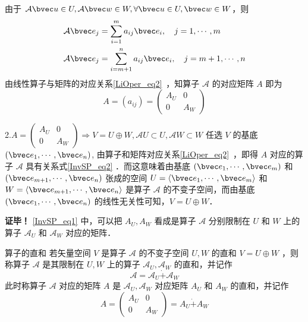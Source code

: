 由于 $\mathcal{A}\bvec u\in U, \mathcal{A}\bvec w\in W,\forall \bvec u\in U,\bvec w\in W$，则
\begin{equation}\label{InvSP_eq2}
\begin{aligned}
\mathcal{A}\bvec e_j&=\sum_{i=1}^m a_{ij}\bvec e_i,\quad j=1,\cdots ,m\\
\mathcal{A}\bvec e_j&=\sum_{i=m+1}^n a_{ij}\bvec e_i,\quad j=m+1,\cdots ,n
\end{aligned}
\end{equation}
由线性算子与矩阵的对应关系\autoref{LiOper_eq2}~，知算子 $\mathcal{A}$ 的对应矩阵 $A$ 即为 
\begin{equation}
A=(a_{ij})=\begin{pmatrix}
A_U&0\\
0&A_W
\end{pmatrix}
\end{equation}

2.$
A=\begin{pmatrix}
A_U&0\\
0&A_W
\end{pmatrix}\Rightarrow V=U\oplus W,\mathcal{A}U\subset U,\mathcal{A}W\subset W
$
任选 $V$ 的基底 $(\bvec e_1,\cdots,\bvec e_n)$, 由算子和矩阵对应关系\autoref{LiOper_eq2}~，即得 $A$ 对应的算子 $\mathcal{A}$ 具有关系式\autoref{InvSP_eq2} ．而这意味着由基底 $(\bvec e_1,\cdots,\bvec e_m)$ 和 $(\bvec e_{m+1},\cdots,\bvec e_n)$ 张成的空间 $U=\langle\bvec e_1,\cdots,\bvec e_m\rangle$ 和 $W=\langle\bvec e_{m+1},\cdots,\bvec e_n\rangle$ 是算子 $\mathcal{A}$ 的不变子空间，而由基底 $(\bvec e_1,\cdots,\bvec e_n)$ 的线性无关性可知，$V=U\oplus W$．

\textbf{证毕！}
\autoref{InvSP_eq1} 中，可以把 $A_U,A_W$ 看成是算子 $\mathcal{A}$ 分别限制在 $U$ 和 $W$ 上的算子 $\mathcal{A}_U$ 和 $\mathcal{A}_W$ 对应的矩阵．
\begin{definition}{算子的直和}
若矢量空间 $V$ 是算子 $\mathcal{A}$ 的不变子空间 $U,W$ 的直和 $V=U\oplus W$ ，则称算子 $\mathcal{A}$ 是其限制在 $U,W$ 上的算子 $\mathcal{A}_U,\mathcal{A}_W$ 的直和，并记作
\begin{equation}
\mathcal{A}=\mathcal{A}_U\dot{+}\mathcal{A}_W
\end{equation}
此时称算子 $\mathcal{A}$ 对应的矩阵 $A$ 是 $\mathcal{A}_U,\mathcal{A}_W$ 对应矩阵 $A_U$ 和 $A_W$ 的直和，并记作
\begin{equation}
A=\begin{pmatrix}
A_U&0\\
0&A_W
\end{pmatrix}=A_U\dot{+}A_W
\end{equation}

\end{definition}